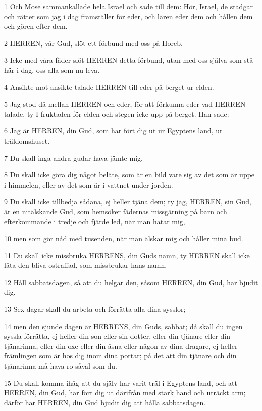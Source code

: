 \par 1 Och Mose sammankallade hela Israel och sade till dem: Hör, Israel, de stadgar och rätter som jag i dag framställer för eder, och lären eder dem och hållen dem och gören efter dem.
\par 2 HERREN, vår Gud, slöt ett förbund med oss på Horeb.
\par 3 Icke med våra fäder slöt HERREN detta förbund, utan med oss själva som stå här i dag, oss alla som nu leva.
\par 4 Ansikte mot ansikte talade HERREN till eder på berget ur elden.
\par 5 Jag stod då mellan HERREN och eder, för att förkunna eder vad HERREN talade, ty I fruktaden för elden och stegen icke upp på berget. Han sade:
\par 6 Jag är HERREN, din Gud, som har fört dig ut ur Egyptens land, ur träldomshuset.
\par 7 Du skall inga andra gudar hava jämte mig.
\par 8 Du skall icke göra dig något beläte, som är en bild vare sig av det som är uppe i himmelen, eller av det som är i vattnet under jorden.
\par 9 Du skall icke tillbedja sådana, ej heller tjäna dem; ty jag, HERREN, sin Gud, är en nitälskande Gud, som hemsöker fädernas missgärning på barn och efterkommande i tredje och fjärde led, när man hatar mig,
\par 10 men som gör nåd med tusenden, när man älskar mig och håller mina bud.
\par 11 Du skall icke missbruka HERRENS, din Guds namn, ty HERREN skall icke låta den bliva ostraffad, som missbrukar hans namn.
\par 12 Håll sabbatsdagen, så att du helgar den, såsom HERREN, din Gud, har bjudit dig.
\par 13 Sex dagar skall du arbeta och förrätta alla dina sysslor;
\par 14 men den sjunde dagen är HERRENS, din Guds, sabbat; då skall du ingen syssla förrätta, ej heller din son eller sin dotter, eller din tjänare eller din tjänarinna, eller din oxe eller din åsna eller någon av dina dragare, ej heller främlingen som är hos dig inom dina portar; på det att din tjänare och din tjänarinna må hava ro såväl som du.
\par 15 Du skall komma ihåg att du själv har varit träl i Egyptens land, och att HERREN, din Gud, har fört dig ut därifrån med stark hand och uträckt arm; därför har HERREN, din Gud bjudit dig att hålla sabbatsdagen.

